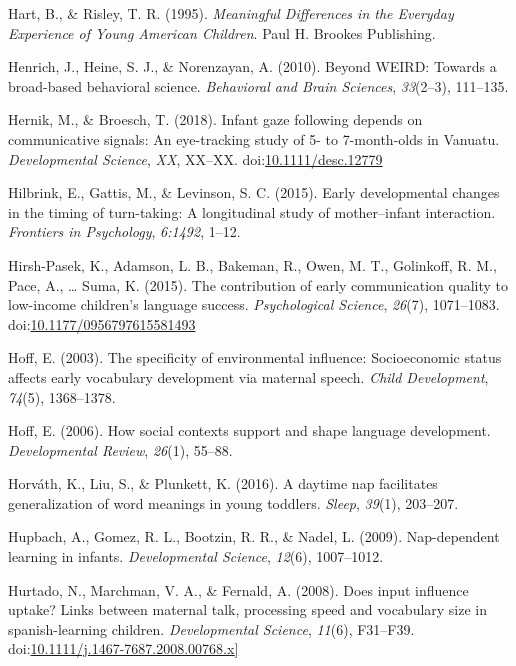\documentclass[floatsintext,man]{apa6}
\theoremstyle{definition}
\theoremstyle{definition}
\theoremstyle{definition}
\theoremstyle{remark}
\begin{document}
\hypertarget{ref-hart1995meaningful}{}
Hart, B., \& Risley, T. R. (1995). \emph{Meaningful Differences in the
Everyday Experience of Young American Children}. Paul H. Brookes
Publishing.

\hypertarget{ref-henrich2010beyond}{}
Henrich, J., Heine, S. J., \& Norenzayan, A. (2010). Beyond WEIRD:
Towards a broad-based behavioral science. \emph{Behavioral and Brain
Sciences}, \emph{33}(2--3), 111--135.

\hypertarget{ref-hernik2018infant}{}
Hernik, M., \& Broesch, T. (2018). Infant gaze following depends on
communicative signals: An eye-tracking study of 5- to 7-month-olds in
Vanuatu. \emph{Developmental Science}, \emph{XX}, XX--XX.
doi:\href{https://doi.org/10.1111/desc.12779}{10.1111/desc.12779}

\hypertarget{ref-hilbrink2015early}{}
Hilbrink, E., Gattis, M., \& Levinson, S. C. (2015). Early developmental
changes in the timing of turn-taking: A longitudinal study of
mother--infant interaction. \emph{Frontiers in Psychology},
\emph{6:1492}, 1--12.

\hypertarget{ref-hirshpasek2015contribution}{}
Hirsh-Pasek, K., Adamson, L. B., Bakeman, R., Owen, M. T., Golinkoff, R.
M., Pace, A., \ldots{} Suma, K. (2015). The contribution of early
communication quality to low-income children's language success.
\emph{Psychological Science}, \emph{26}(7), 1071--1083.
doi:\href{https://doi.org/10.1177/0956797615581493}{10.1177/0956797615581493}

\hypertarget{ref-hoff2003specificity}{}
Hoff, E. (2003). The specificity of environmental influence:
Socioeconomic status affects early vocabulary development via maternal
speech. \emph{Child Development}, \emph{74}(5), 1368--1378.

\hypertarget{ref-hoff2006social}{}
Hoff, E. (2006). How social contexts support and shape language
development. \emph{Developmental Review}, \emph{26}(1), 55--88.

\hypertarget{ref-horvath2016daytime}{}
Horváth, K., Liu, S., \& Plunkett, K. (2016). A daytime nap facilitates
generalization of word meanings in young toddlers. \emph{Sleep},
\emph{39}(1), 203--207.

\hypertarget{ref-hupbach2009nap}{}
Hupbach, A., Gomez, R. L., Bootzin, R. R., \& Nadel, L. (2009).
Nap-dependent learning in infants. \emph{Developmental Science},
\emph{12}(6), 1007--1012.

\hypertarget{ref-hurtado2008does}{}
Hurtado, N., Marchman, V. A., \& Fernald, A. (2008). Does input
influence uptake? Links between maternal talk, processing speed and
vocabulary size in spanish-learning children. \emph{Developmental
Science}, \emph{11}(6), F31--F39.
doi:\href{https://doi.org/10.1111/j.1467-7687.2008.00768.x\%5D}{10.1111/j.1467-7687.2008.00768.x{]}}
\end{document}
